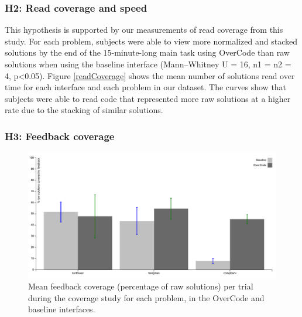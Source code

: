 \subsubsection{H2: Read coverage and speed}
This hypothesis is supported by our measurements of read coverage from this study. For each problem, subjects were able to view more normalized and stacked solutions by the end of the 15-minute-long main task using OverCode than raw solutions when using the baseline interface (Mann--Whitney U = 16, n1 = n2 = 4, p<0.05). Figure \ref{readCoverage} shows the mean number of solutions read over time for each interface and each problem in our dataset. The curves show that subjects were able to read code that represented more raw solutions at a higher rate due to the stacking of similar solutions.

\subsubsection{H3: Feedback coverage}

\begin{figure}[b!]
\includegraphics[width=0.6\paperwidth]{Body/figures/overcode/feedbackCoverage.pdf}
\caption{Mean feedback coverage (percentage of raw solutions) per trial during the coverage study for each problem, in the OverCode and baseline interfaces.}
\label{aveCoveragePerPost}
\end{figure}

